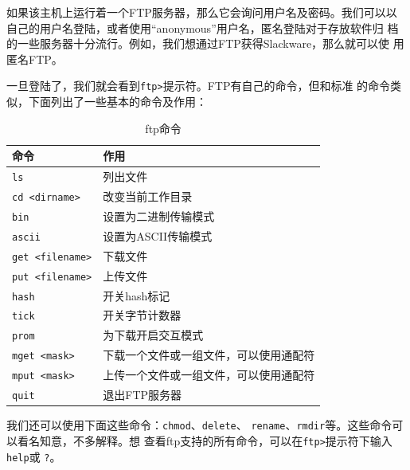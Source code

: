如果该主机上运行着一个FTP服务器，那么它会询问用户名及密码。我们可以以
自己的用户名登陆，或者使用``anonymous''用户名，匿名登陆对于存放软件归
档的一些服务器十分流行。例如，我们想通过FTP获得Slackware，那么就可以使
用匿名FTP。

一旦登陆了，我们就会看到\texttt{ftp>}提示符。FTP有自己的命令，但和标准
的命令类似，下面列出了一些基本的命令及作用：
\begin{table}[htpb]
  \centering
  \begin{tabular}{l|l}
    \hline \hline
    命令 & 作用 \\ \hline
    \texttt{ls} & 列出文件 \\
    \texttt{cd <dirname>} & 改变当前工作目录 \\
    \texttt{bin} & 设置为二进制传输模式 \\
    \texttt{ascii} & 设置为ASCII传输模式 \\
    \texttt{get <filename>} & 下载文件 \\
    \texttt{put <filename>} & 上传文件 \\
    \texttt{hash} & 开关hash标记 \\
    \texttt{tick} & 开关字节计数器 \\
    \texttt{prom} & 为下载开启交互模式 \\
    \texttt{mget <mask>} & 下载一个文件或一组文件，可以使用通配符 \\
    \texttt{mput <mask>} & 上传一个文件或一组文件，可以使用通配符 \\
    \texttt{quit} & 退出FTP服务器 \\
    \hline \hline
  \end{tabular}
  \caption{ftp命令}
  \label{tab:ftp-commands}
\end{table}

我们还可以使用下面这些命令：\texttt{chmod}、\texttt{delete}、
\texttt{rename}、\texttt{rmdir}等。这些命令可以看名知意，不多解释。想
查看ftp支持的所有命令，可以在\texttt{ftp>}提示符下输入\texttt{help}或
\texttt{?}。

